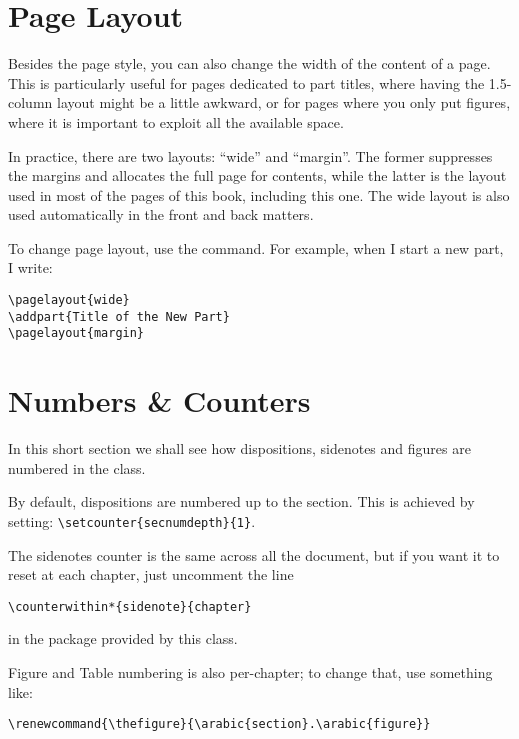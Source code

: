 \section{Page Layout}

Besides the page style, you can also change the width of the content of 
a page. This is particularly useful for pages dedicated to part titles, 
where having the 1.5-column layout might be a little awkward, or for 
pages where you only put figures, where it is important to exploit all 
the available space.

In practice, there are two layouts: \enquote{wide} and \enquote{margin}. 
The former suppresses the margins and allocates the full page for 
contents, while the latter is the layout used in most of the pages of 
this book, including this one. The wide layout is also used 
automatically in the front and back matters.

To change page layout, use the  command. For 
example, when I start a new part, I write:

\begin{lstlisting}
\pagelayout{wide}
\addpart{Title of the New Part}
\pagelayout{margin}
\end{lstlisting}

\section{Numbers \& Counters}

In this short section we shall see how dispositions, sidenotes and 
figures are numbered in the  class.

By default, dispositions are numbered up to the section. This is 
achieved by setting: \lstinline|\setcounter{secnumdepth}{1}|.

The sidenotes counter is the same across all the document, but if you 
want it to reset at each chapter, just uncomment the line

\begin{lstlisting}[style=kaolstplain]
\counterwithin*{sidenote}{chapter}
\end{lstlisting}

in the  package provided by this class.

Figure and Table numbering is also per-chapter; to change that, use 
something like:

\begin{lstlisting}[style=kaolstplain]
\renewcommand{\thefigure}{\arabic{section}.\arabic{figure}}
\end{lstlisting}

